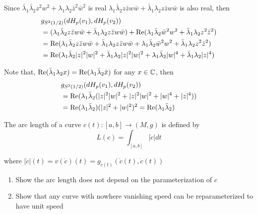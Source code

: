 \begin{longproof}
	Since $\bar{\lambda}_1 \bar{\lambda}_2 z^2 w^2 + \lambda_1 \lambda_2 \bar{z}^2 \bar{w}^2$ is real $\lambda_1 \bar{\lambda}_2 z \bar{z} w \bar{w} + \bar{\lambda}_1 \lambda_2 z \bar{z} w \bar{w}$ is also real, then
	\begin{align*}
		&g_{S^2(1/2)}(dH_p(v_1), dH_p(v_2)) \\ 
		&= (\lambda_1 \bar{\lambda}_2 z \bar{z} w \bar{w} + \bar{\lambda}_1 \lambda_2 z \bar{z} w \bar{w}) + \operatorname{Re}(\lambda_1 \bar{\lambda}_2 \bar{w}^2 w^2 + \bar{\lambda}_1 \lambda_2 z^2 \bar{z}^2 ) \\
		&= \operatorname{Re}(\lambda_1 \bar{\lambda}_2 z \bar{z} w \bar{w} + \bar{\lambda}_1 \lambda_2 z \bar{z} w \bar{w} + \lambda_1 \bar{\lambda}_2 \bar{w}^2 w^2 + \bar{\lambda}_1 \lambda_2 z^2 \bar{z}^2 ) \\
		&= \operatorname{Re}(\lambda_1 \bar{\lambda}_2 \lvert z\rvert^2 \lvert w\rvert^2 + \bar{\lambda}_1 \lambda_2 \lvert z\rvert^2 \lvert w\rvert^2 + \lambda_1 \bar{\lambda}_2 \lvert w\rvert^4 + \bar{\lambda}_1 \lambda_2 \lvert z\rvert^4 )
	\end{align*}
	
	Note that, $\operatorname{Re}(\bar{\lambda}_1 \lambda_2 x) = \operatorname{Re}(\lambda_1 \bar{\lambda}_2 \bar{x})$ for any $x \in \mathbb{C}$, then
	\begin{align*}
		&g_{S^2(1/2)}(dH_p(v_1), dH_p(v_2)) \\ 
		&= \operatorname{Re}(\lambda_1 \bar{\lambda}_2 (\lvert z\rvert^2 \lvert w\rvert^2 + \lvert z\rvert^2 \lvert w\rvert^2 + \lvert w\rvert^4 + \lvert z\rvert^4)) \\
		&= \operatorname{Re}(\lambda_1 \bar{\lambda}_2) (\lvert z\rvert^2 + \lvert w\rvert^2)^2 = \operatorname{Re}(\lambda_1 \bar{\lambda}_2)
	\end{align*}
\end{longproof}


\begin{problem}
	The arc length of a curve $c(t): [a, b] \to (M, g)$ is defined by
	$$
		L(c) = \int_{[a, b]} |\dot{c}| dt
	$$
	
	where $|\dot{c}|(t) = v(\dot{c})(t) = g_{c(t)}(\dot{c}(t), \dot{c}(t))$
	
	\begin{enumerate}
		\item Show the arc length does not depend on the parameterization of $c$
		\item Show that any curve with nowhere vanishing speed can be reparameterized to have unit speed
	\end{enumerate}
\end{problem}

